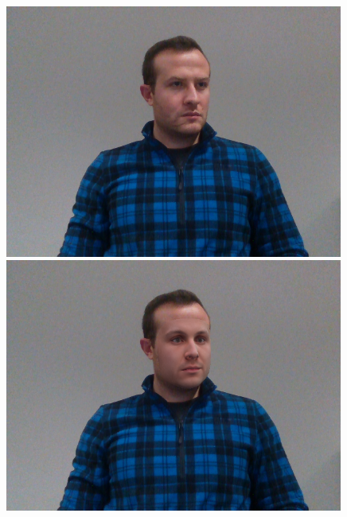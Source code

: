 \begin{figure}[h]
    \begin{minipage}{.325\textwidth}
      \centering
      \includegraphics[width=0.99\textwidth]{Figures/dataset/target/4.png}
    \end{minipage}
    \begin{minipage}{.325\textwidth}
      \centering
      \includegraphics[width=0.99\textwidth]{Figures/dataset/our/4blended.png}
    \end{minipage}
    \begin{minipage}{.325\textwidth}
      \centering

\end{minipage}
\end{figure}
